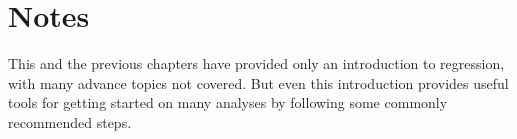 \section{Notes}

This and the previous chapters have provided only an introduction to regression, with many advance topics not covered. But even this introduction provides useful tools for getting started on many analyses by following some commonly recommended steps.

